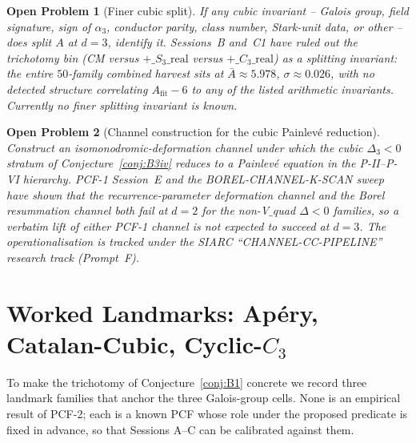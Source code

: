 \documentclass[11pt,a4paper]{article}
\newtheorem{problem}{Open Problem}
\theoremstyle{definition}
\theoremstyle{remark}
\begin{document}
\begin{problem}[Finer cubic split]\label{op:finer-cubic-split}
If any cubic invariant -- Galois group, field signature, sign of
$\alpha_{3}$, conductor parity, class number, Stark-unit data, or
other -- \emph{does} split $A$ at $d=3$, identify it. Sessions~B
and~C1 have ruled out the trichotomy bin (CM versus
$+\_S_{3}\_\mathrm{real}$ versus $+\_C_{3}\_\mathrm{real}$) as a
splitting invariant: the entire $50$-family combined harvest sits at
$\bar{A}\approx 5.978$, $\sigma\approx 0.026$, with no detected
structure correlating $A_{\mathrm{fit}}-6$ to any of the listed
arithmetic invariants. Currently no finer splitting invariant is
known.
\end{problem}

\begin{problem}[Channel construction for the cubic Painlev\'e
reduction]\label{op:cc-pipeline}
Construct an isomonodromic-deformation channel under which the cubic
$\Delta_{3}<0$ stratum of Conjecture~\ref{conj:B3iv} reduces to a
Painlev\'e equation in the P-II--P-VI hierarchy. PCF-1 Session~E and
the BOREL-CHANNEL-K-SCAN sweep~\cite{Papanokechi2026PCF1} have shown
that the recurrence-parameter deformation channel and the Borel
resummation channel both fail at $d=2$ for the
non-V$\_$quad $\Delta<0$ families, so a verbatim lift of either
PCF-1 channel is not expected to succeed at $d=3$. The
operationalisation is tracked under the SIARC ``CHANNEL-CC-PIPELINE''
research track (Prompt~F).
\end{problem}

\section{Worked Landmarks: Ap\'ery, Catalan-Cubic, Cyclic-$C_{3}$}\label{sec:landmarks}

To make the trichotomy of Conjecture~\ref{conj:B1} concrete we record
three landmark families that anchor the three Galois-group cells. None
is an empirical result of PCF-2; each is a known PCF whose role under
the proposed predicate is fixed in advance, so that Sessions A--C can be
calibrated against them.
\end{document}
